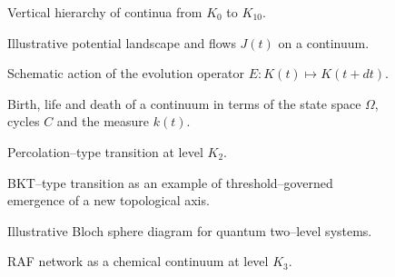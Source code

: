 \begin{figure}[p]
  \centering
  
  \caption{Vertical hierarchy of continua from \texorpdfstring{\(K_0\)}{K_0} to \(K_{10}\).}
  \label{fig:levels-hierarchy}
\end{figure}

\begin{figure}[p]
  \centering
  
  \caption{Illustrative potential landscape and flows \(J(t)\) on a continuum.}
  \label{fig:potential-landscape}
\end{figure}

\begin{figure}[p]
  \centering
  
  \caption{Schematic action of the evolution operator
           \(E : K(t) \mapsto K(t+dt)\).}
  \label{fig:evolution-operator}
\end{figure}

\begin{figure}[p]
  \centering
  
  \caption{Birth, life and death of a continuum in terms of the state space
           \texorpdfstring{\(\Omega\)}{\Omega}, cycles \texorpdfstring{\(C\)}{C} and the measure \(k(t)\).}
  \label{fig:birth-life-death}
\end{figure}

\begin{figure}[p]
  \centering
  
  \caption{Percolation--type transition at level \texorpdfstring{\(K_2\)}{K_2}.}
  \label{fig:percolation}
\end{figure}

\begin{figure}[p]
  \centering
  
  \caption{BKT--type transition as an example of threshold--governed emergence
           of a new topological axis.}
  \label{fig:bkt-transition}
\end{figure}

\begin{figure}[p]
  \centering
  
  \caption{Illustrative Bloch sphere diagram for quantum two--level systems.}
  \label{fig:bloch-sphere}
\end{figure}

\begin{figure}[p]
  \centering
  
  \caption{RAF network as a chemical continuum at level \texorpdfstring{\(K_3\)}{K_3}.}
  \label{fig:raf-network}
\end{figure}

